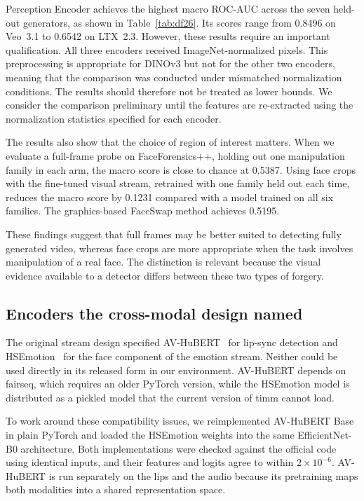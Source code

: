 \documentclass[conference]{IEEEtran}
\begin{document}
Perception Encoder achieves the highest macro ROC-AUC across the seven
held-out generators, as shown in Table~\ref{tab:df26}. Its scores range from
0.8496 on Veo~3.1 to 0.6542 on LTX~2.3. However, these results require an
important qualification. All three encoders received ImageNet-normalized
pixels. This preprocessing is appropriate for DINOv3 but not for the other
two encoders, meaning that the comparison was conducted under mismatched
normalization conditions. The results should therefore not be treated as
lower bounds. We consider the comparison preliminary until the features are
re-extracted using the normalization statistics specified for each encoder.

The results also show that the choice of region of interest matters. When
we evaluate a full-frame probe on FaceForensics++, holding out one
manipulation family in each arm, the macro score is close to chance at
0.5387. Using face crops with the fine-tuned visual stream, retrained with
one family held out each time, reduces the macro score by 0.1231 compared
with a model trained on all six families. The graphics-based FaceSwap method
achieves 0.5195.

These findings suggest that full frames may be better suited to detecting
fully generated video, whereas face crops are more appropriate when the
task involves manipulation of a real face. The distinction is relevant
because the visual evidence available to a detector differs between these
two types of forgery.

\subsection{Encoders the cross-modal design named}

The original stream design specified AV-HuBERT~\cite{avhubert} for lip-sync
detection and HSEmotion~\cite{hsemotion} for the face component of the
emotion stream. Neither could be used directly in its released form in our
environment. AV-HuBERT depends on fairseq, which requires an older PyTorch
version, while the HSEmotion model is distributed as a pickled model that
the current version of timm cannot load.

To work around these compatibility issues, we reimplemented AV-HuBERT Base
in plain PyTorch and loaded the HSEmotion weights into the same
EfficientNet-B0 architecture. Both implementations were checked against
the official code using identical inputs, and their features and logits
agree to within $2\times10^{-6}$. AV-HuBERT is run separately on the lips
and the audio because its pretraining maps both modalities into a shared
representation space.
\end{document}
